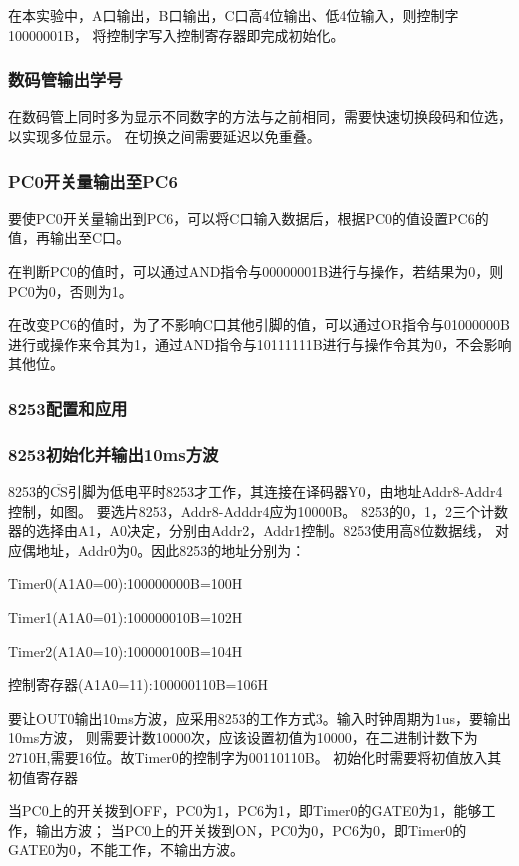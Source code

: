 \documentclass[12pt, a4paper, oneside]{ctexart}
\begin{document}
    在本实验中，A口输出，B口输出，C口高4位输出、低4位输入，则控制字10000001B，
    将控制字写入控制寄存器即完成初始化。

    \subsubsection{数码管输出学号}
    在数码管上同时多为显示不同数字的方法与之前相同，需要快速切换段码和位选，以实现多位显示。
    在切换之间需要延迟以免重叠。

    \subsubsection{PC0开关量输出至PC6}
    要使PC0开关量输出到PC6，可以将C口输入数据后，根据PC0的值设置PC6的值，再输出至C口。
    
    在判断PC0的值时，可以通过AND指令与00000001B进行与操作，若结果为0，则PC0为0，否则为1。

    在改变PC6的值时，为了不影响C口其他引脚的值，可以通过OR指令与01000000B进行或操作来令其为1，通过AND指令与10111111B进行与操作令其为0，不会影响其他位。
    \subsubsection{8253配置和应用}
    \subsubsection{8253初始化并输出10ms方波}
    8253的$\overline{\text{CS}}$引脚为低电平时8253才工作，其连接在译码器Y0，由地址Addr8-Addr4控制，如图。
    要选片8253，Addr8-Adddr4应为10000B。
    8253的0，1，2三个计数器的选择由A1，A0决定，分别由Addr2，Addr1控制。8253使用高8位数据线，
    对应偶地址，Addr0为0。因此8253的地址分别为：

    Timer0(A1A0=00):100000000B=100H

    Timer1(A1A0=01):100000010B=102H

    Timer2(A1A0=10):100000100B=104H

    控制寄存器(A1A0=11):100000110B=106H

    要让OUT0输出10ms方波，应采用8253的工作方式3。输入时钟周期为1us，要输出10ms方波，
    则需要计数10000次，应该设置初值为10000，在二进制计数下为2710H,需要16位。故Timer0的控制字为00110110B。
    初始化时需要将初值放入其初值寄存器

    当PC0上的开关拨到OFF，PC0为1，PC6为1，即Timer0的GATE0为1，能够工作，输出方波；
    当PC0上的开关拨到ON，PC0为0，PC6为0，即Timer0的GATE0为0，不能工作，不输出方波。
\end{document}
